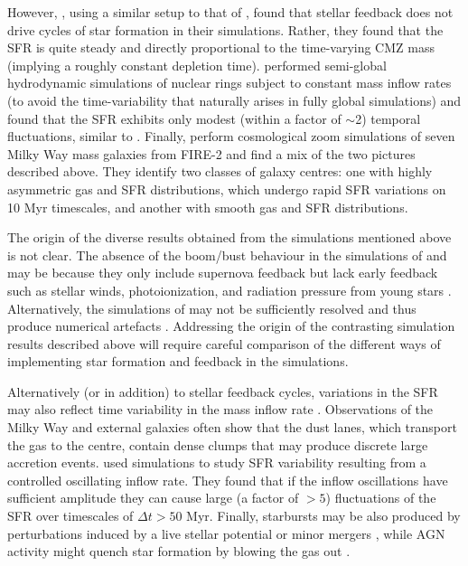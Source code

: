 However, \cite{Sormani2020b}, using a similar setup to that of \citet{Armillotta2019}, found that stellar feedback does not drive cycles of star formation in their simulations. Rather, they found that the SFR is quite steady and directly proportional to the time-varying CMZ mass (implying a roughly constant depletion time). \cite{Moon2021} performed semi-global hydrodynamic simulations of nuclear rings subject to constant mass inflow rates (to avoid the time-variability that naturally arises in fully global simulations) and found that the SFR exhibits only modest (within a factor of $\sim$2) temporal fluctuations, similar to \cite{Sormani2020b}. 
Finally, \citet{Orr2021} perform cosmological zoom simulations of seven Milky Way mass galaxies from FIRE-2 and find a mix of the two pictures described above. They identify two classes of galaxy centres: one with highly asymmetric gas and SFR distributions, which undergo rapid SFR variations on 10 Myr timescales, and another with smooth gas and SFR distributions. 

The origin of the diverse results obtained from the simulations mentioned above is not clear. The absence of the boom/bust behaviour in the simulations of \cite{Sormani2020b} and \cite{Moon2021} may be because they only include supernova feedback but lack early feedback such as stellar winds, photoionization, and radiation pressure from young stars \citep[which can disperse gas to parsec scales surrounding sites of star formation before the onset of the first supernova;][]{Barnes2020b}. Alternatively, the simulations of \cite{Armillotta2019} may not be sufficiently resolved and thus produce numerical artefacts \citep{Sormani2020b,Moon2021}. Addressing the origin of the contrasting simulation results described above will require careful comparison of the different ways of implementing star formation and feedback in the simulations.

Alternatively (or in addition) to stellar feedback cycles, variations in the SFR may also reflect time variability in the mass inflow rate \citep[][]{Seo2019,Sormani2020b, Moon2022}. Observations of the Milky Way \citep{Sormani2019b} and external galaxies \citep{Leroy2021, Beslic2021} often show that the dust lanes, which transport the gas to the centre, contain dense clumps that may produce discrete large accretion events. 
\citet{Moon2022} used simulations to study SFR variability resulting from a controlled oscillating inflow rate. 
They found that if the inflow oscillations have sufficient amplitude they can cause large (a factor of $>5$) fluctuations of the SFR over timescales of $\Delta t > 50$ Myr. Finally, starbursts may be also produced by perturbations induced by a live stellar potential \citep[][as opposed to the fixed potential in the above simulations]{Emsellem2015} or minor mergers \citep{Mihos1994}, while AGN activity might quench star formation by blowing the gas out \citep{Combes2017a}.

